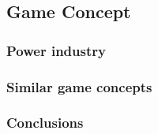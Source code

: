 \subsection{Game Concept}

\subsubsection{Power industry}

\subsubsection{Similar game concepts}


\subsubsection{Conclusions}
